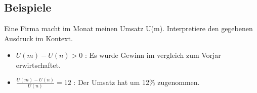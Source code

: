 \subsection{Beispiele}

\hfill \break
Eine Firma macht im Monat meinen Umsatz U(m). Interpretiere den gegebenen Ausdruck im Kontext.
\begin{itemize}
    \item $U(m)-U(n) >0$ : Es wurde Gewinn im vergleich zum Vorjar erwirtschaftet.
    \item $\frac{U(m)-U(n)}{U(n)} = 12$ : Der Umsatz hat um 12\% zugenommen.
\end{itemize}